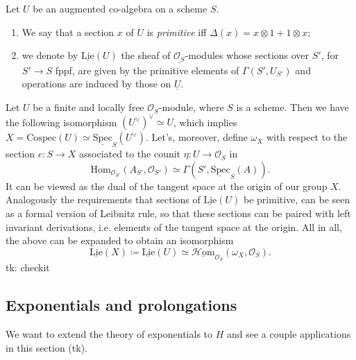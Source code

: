 \documentclass[../Main]{subfiles}
\begin{document}
\begin{defn}[]
	Let $U$ be an augmented co-algebra on a scheme $S$.
\begin{enumerate}
\item We say that a section $x$ of $U$ is {\em primitive} iff
	$\Delta(x) = x \otimes 1 + 1 \otimes x$;

\item we denote by $\underline{\mathrm{Lie}}(U)$ the sheaf of $\underline{\mathcal{O}_{ S }}$-modules
	whose sections over $S'$, for $S' \to S$ fppf, are given by the primitive
	elements of $\Gamma(S', U_{S'})$ and operations are induced by those on $\underline{U}$.
\end{enumerate}
\end{defn}


\begin{rem}
	Let $U$ be a finite and locally free $\mathcal{O}_{ S }$-module,
	where $S$ is a scheme.
	Then we have the following isomorphism $(U^\vee)^\vee \simeq U$,
	which implies $X = \mathrm{Cospec}(U) \simeq 
	\underline{\mathrm{Spec}}_S(U^\vee)$.
	Let's, moreover, define $\omega_X$ with respect to the section $e\colon S \to X$
	associated to the counit $\eta\colon U \to \mathcal{O}_{ S }$ in
	\begin{equation*}
		\mathrm{Hom}_{ \mathcal{O}_{ S' }}
		\left( A_{S'}, \mathcal{O}_{ S' } \right) 
		\simeq
		\Gamma(S', \underline{\mathrm{Spec}}_S(A))
	.\end{equation*}
	It can be viewed as the dual of the tangent space at the origin
	of our group $X$.
	Analogously the requirements that sections of $\underline{\mathrm{Lie}}(U)$
	be primitive, can be seen as a formal version of Leibnitz rule,
	so that these sections can be paired with left invariant derivations, i.e.
	elements of the tangent space at the origin.
	All in all, the above can be expanded to obtain an isomorphism
	\begin{equation*}
		\underline{\mathrm{Lie}}(X) \coloneqq
		\underline{\mathrm{Lie}}(U) \simeq
		\underline{\mathcal{H}\mathrm{om}}_{ \mathcal{O}_{ S } } 
		\left(\omega_X , \mathcal{O}_{ S } \right)
	.\end{equation*}
	tk: checkit
\end{rem}


\subsection{Exponentials and prolongations}
We want to extend the theory of exponentials to $H$ and 
see a couple applications in this section (tk).
\end{document}
